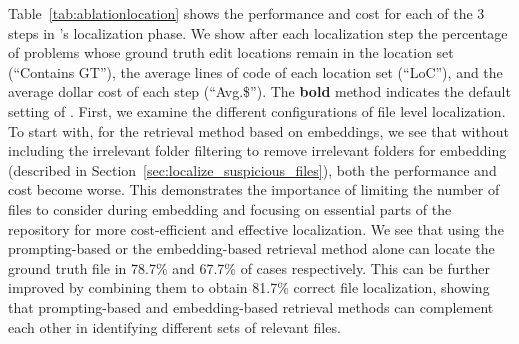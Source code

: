 Table~\ref{tab:ablationlocation} shows the performance and cost for each of the 3 steps in \tech's localization phase.
We show after each localization step the percentage of problems whose ground truth edit locations remain in the location set (``Contains GT''), the average lines of code {of each location set (``LoC'')}, and the average dollar cost of each step (``Avg.\$'').
The \textbf{bold} method indicates the default setting of \tech. 
First, we examine the different configurations of file level localization. 
To start with, for the retrieval method based on embeddings, we see that without including the irrelevant folder filtering to remove irrelevant folders for embedding (described in Section~\ref{sec:localize_suspicious_files}), both the performance and cost become worse. 
This demonstrates the importance of limiting the number of files to consider during embedding and focusing on essential parts of the repository for more cost-efficient and effective localization.
We see that using the prompting-based or the embedding-based retrieval method alone can locate the ground truth file in 78.7\% and 67.7\% of cases respectively. 
This can be further improved by combining them to obtain 81.7\% correct file localization, showing that prompting-based and embedding-based retrieval methods can complement each other in identifying different sets of {relevant} files.


\begin{table}
\footnotesize
\centering
\caption{Performance of different repair setups.}
\label{tab:ablationrepair}
\end{table}


